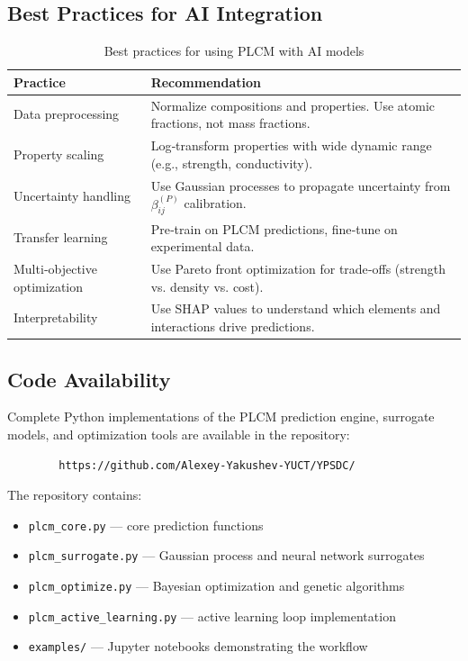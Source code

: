 \documentclass[12pt,a4paper]{article}
\begin{document}
	\subsection{Best Practices for AI Integration}
	
	\begin{table}[htbp]
		\centering
		\caption{Best practices for using PLCM with AI models}
		\label{tab:ai-best-practices}
		\begin{tabular}{p{4cm}p{10cm}}
			\toprule
			\textbf{Practice} & \textbf{Recommendation} \\
			\midrule
			Data preprocessing & Normalize compositions and properties. Use atomic fractions, not mass fractions. \\
			Property scaling & Log‑transform properties with wide dynamic range (e.g., strength, conductivity). \\
			Uncertainty handling & Use Gaussian processes to propagate uncertainty from \(\beta_{ij}^{(P)}\) calibration. \\
			Transfer learning & Pre‑train on PLCM predictions, fine‑tune on experimental data. \\
			Multi‑objective optimization & Use Pareto front optimization for trade‑offs (strength vs. density vs. cost). \\
			Interpretability & Use SHAP values to understand which elements and interactions drive predictions. \\
			\bottomrule
		\end{tabular}
	\end{table}
	
	\subsection{Code Availability}
	
	Complete Python implementations of the PLCM prediction engine, surrogate models, and optimization tools are available in the repository:
	
	\begin{verbatim}
		https://github.com/Alexey-Yakushev-YUCT/YPSDC/ 
	\end{verbatim}
	
	The repository contains:
	\begin{itemize}
		\item \texttt{plcm\_core.py} — core prediction functions
		\item \texttt{plcm\_surrogate.py} — Gaussian process and neural network surrogates
		\item \texttt{plcm\_optimize.py} — Bayesian optimization and genetic algorithms
		\item \texttt{plcm\_active\_learning.py} — active learning loop implementation
		\item \texttt{examples/} — Jupyter notebooks demonstrating the workflow
	\end{itemize}
	
\end{document}
